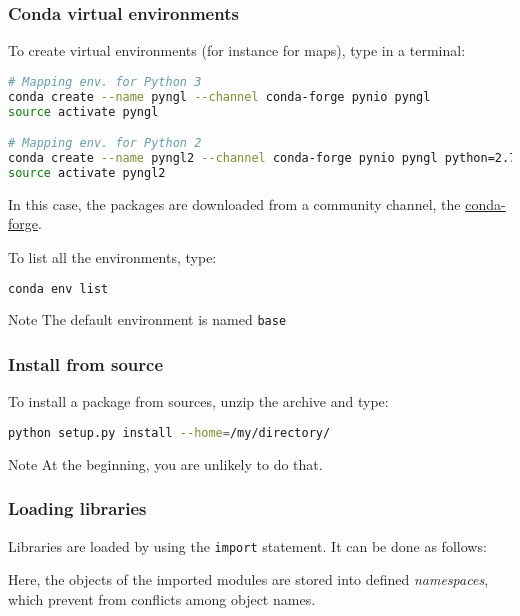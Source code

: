 \begin{frame}[fragile]
\frametitle{Conda virtual environments}

To create virtual environments (for instance for maps), type in a terminal:

\begin{lstlisting}[language=bash]
# Mapping env. for Python 3
conda create --name pyngl --channel conda-forge pynio pyngl
source activate pyngl

# Mapping env. for Python 2
conda create --name pyngl2 --channel conda-forge pynio pyngl python=2.7
source activate pyngl2
\end{lstlisting}

In this case, the packages are downloaded from a community channel, the \href{https://conda-forge.org/}{conda-forge}.\\
\vspace{1em}

To list all the environments, type: 

\begin{lstlisting}[language=bash, basicstyle=\ttfamily\scriptsize] 
conda env list
\end{lstlisting}

\begin{block}{Note}
The default environment is named \verb+base+
\end{block} 

\end{frame}

\begin{frame}[fragile]
    \frametitle{Install from source}

    To install a package from sources, unzip the archive and type:
    \begin{lstlisting}[language=bash, basicstyle=\ttfamily\scriptsize] 
python setup.py install --home=/my/directory/
    \end{lstlisting}

    \begin{block}{Note}
At the beginning, you are unlikely to do that.
    \end{block}

\end{frame}

\begin{frame}[fragile]
    \frametitle{Loading libraries}
    Libraries are loaded by using the \verb+import+ statement. It can be done as follows:
    

    \vspace{1em}
    Here, the objects of the imported modules are stored into defined \emph{namespaces}, which prevent from conflicts among object names.
\end{frame}

